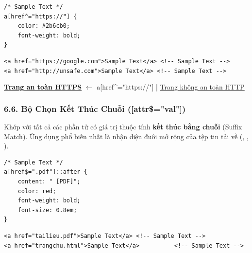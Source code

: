 \begin{codeWindow}
\begin{lstlisting}[language=CSS3]
/* Sample Text */
a[href^="https://"] {
    color: #2b6cb0;
    font-weight: bold;
}
\end{lstlisting}

\begin{lstlisting}[language=HTML5]
<a href="https://google.com">Sample Text</a> <!-- Sample Text -->
<a href="http://unsafe.com">Sample Text</a> <!-- Sample Text -->
\end{lstlisting}
\end{codeWindow}

\begin{browserWindow}
\sffamily\small
\textcolor{primaryBlue}{\textbf{\underline{Trang an toàn HTTPS}}} \textcolor{gray!60}{\scriptsize $\leftarrow$ a[href\textasciicircum{}="https://"]} \quad | \quad
\textcolor{darkText}{\underline{Trang không an toàn HTTP}}
\end{browserWindow}

\subsubsection{6.6. Bộ Chọn Kết Thúc Chuỗi ([attr\$="val"])}

\begin{conceptBox}
Khớp với tất cả các phần tử có giá trị thuộc tính \textbf{kết thúc bằng chuỗi } (Suffix Match). Ứng dụng phổ biến nhất là nhận diện đuôi mở rộng của tệp tin tải về (, , ).
\end{conceptBox}

\begin{codeWindow}
\begin{lstlisting}[language=CSS3]
/* Sample Text */
a[href$=".pdf"]::after {
    content: " [PDF]";
    color: red;
    font-weight: bold;
    font-size: 0.8em;
}
\end{lstlisting}

\begin{lstlisting}[language=HTML5]
<a href="tailieu.pdf">Sample Text</a> <!-- Sample Text -->
<a href="trangchu.html">Sample Text</a>          <!-- Sample Text -->
\end{lstlisting}
\end{codeWindow}

